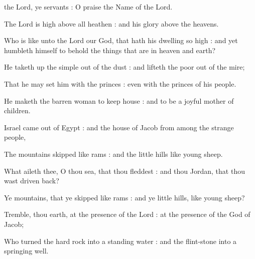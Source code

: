 
 the Lord, ye servants : O praise the Name of the Lord.\par
{}
The Lord is high above all heathen : and his glory above the heavens.\par
{}Who is like unto the Lord our God, that hath his dwelling so high : and yet humbleth himself to behold the things that are in heaven and earth?\par
{}He taketh up the simple out of the dust : and lifteth the poor out of the mire;\par
{}That he may set him with the princes : even with the princes of his people.\par
{}He maketh the barren woman to keep house : and to be a joyful mother of children.\par



 Israel came out of Egypt : and the house of Jacob from among the strange people,\par
{}
The mountains skipped like rams : and the little hills like young sheep.\par
{}What aileth thee, O thou sea, that thou fleddest : and thou Jordan, that thou wast driven back?\par
{}Ye mountains, that ye skipped like rams : and ye little hills, like young sheep?\par
{}Tremble, thou earth, at the presence of the Lord : at the presence of the God of Jacob;\par
{}Who turned the hard rock into a standing water : and the flint-stone into a springing well.\par


